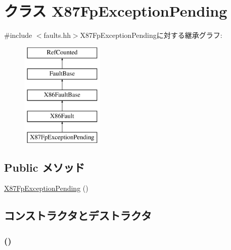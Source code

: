 \hypertarget{classX86ISA_1_1X87FpExceptionPending}{
\section{クラス X87FpExceptionPending}
\label{classX86ISA_1_1X87FpExceptionPending}
}


{\ttfamily \#include $<$faults.hh$>$}X87FpExceptionPendingに対する継承グラフ:\begin{figure}[H]
\begin{center}
\leavevmode
\includegraphics[height=5cm]{classX86ISA_1_1X87FpExceptionPending}
\end{center}
\end{figure}
\subsection*{Public メソッド}
\begin{DoxyCompactItemize}
\item 
\hyperlink{classX86ISA_1_1X87FpExceptionPending_afe848dec897c021b9c1d56dda6b38adf}{X87FpExceptionPending} ()
\end{DoxyCompactItemize}


\subsection{コンストラクタとデストラクタ}
\hypertarget{classX86ISA_1_1X87FpExceptionPending_afe848dec897c021b9c1d56dda6b38adf}{
\subsubsection[{X87FpExceptionPending}]{ ()}}
\label{classX86ISA_1_1X87FpExceptionPending_afe848dec897c021b9c1d56dda6b38adf}



